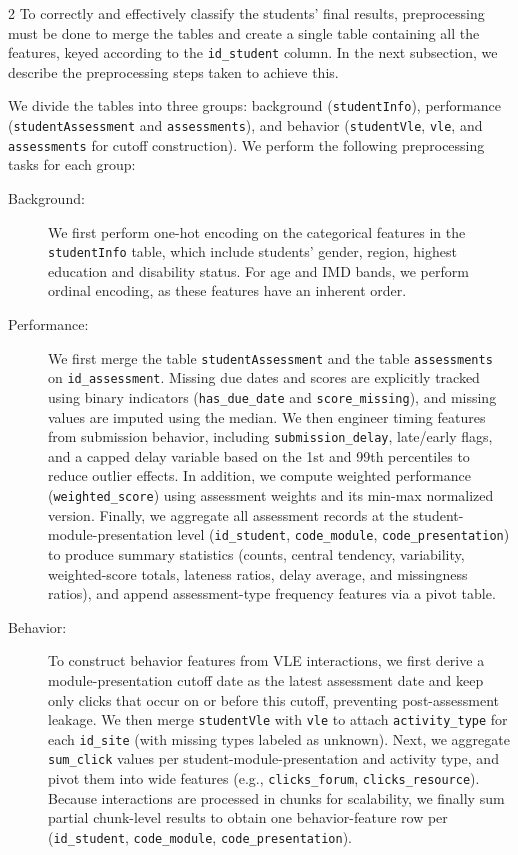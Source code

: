 \begin{multicols}{2}
To correctly and effectively classify the students' final results, preprocessing must be done to merge the tables and create a single table containing all the features, keyed according to the \texttt{id\_student} column. In the next subsection, we describe the preprocessing steps taken to achieve this.

We divide the tables into three groups: background (\texttt{studentInfo}), performance (\texttt{studentAssessment} and \texttt{assessments}), and behavior (\texttt{studentVle}, \texttt{vle}, and \texttt{assessments} for cutoff construction). We perform the following preprocessing tasks for each group:

\begin{description}
    \item[Background:] We first perform one-hot encoding on the categorical features in the \texttt{studentInfo} table, which include students' gender, region, highest education and disability status. For age and IMD bands, we perform ordinal encoding, as these features have an inherent order.
    \item[Performance:] We first merge the table \texttt{studentAssessment} and the table \texttt{assessments} on \texttt{id\_assessment}. Missing due dates and scores are explicitly tracked using binary indicators (\texttt{has\_due\_date} and \texttt{score\_missing}), and missing values are imputed using the median. We then engineer timing features from submission behavior, including \texttt{submission\_delay}, late/early flags, and a capped delay variable based on the 1st and 99th percentiles to reduce outlier effects. In addition, we compute weighted performance (\texttt{weighted\_score}) using assessment weights and its min-max normalized version. Finally, we aggregate all assessment records at the student-module-presentation level (\texttt{id\_student}, \texttt{code\_module}, \texttt{code\_presentation}) to produce summary statistics (counts, central tendency, variability, weighted-score totals, lateness ratios, delay average, and missingness ratios), and append assessment-type frequency features via a pivot table.
    \item[Behavior:] To construct behavior features from VLE interactions, we first derive a module-presentation cutoff date as the latest assessment date and keep only clicks that occur on or before this cutoff, preventing post-assessment leakage. We then merge \texttt{studentVle} with \texttt{vle} to attach \texttt{activity\_type} for each \texttt{id\_site} (with missing types labeled as unknown). Next, we aggregate \texttt{sum\_click} values per student-module-presentation and activity type, and pivot them into wide features (e.g., \texttt{clicks\_forum}, \texttt{clicks\_resource}). Because interactions are processed in chunks for scalability, we finally sum partial chunk-level results to obtain one behavior-feature row per (\texttt{id\_student}, \texttt{code\_module}, \texttt{code\_presentation}).
\end{description}


\end{multicols}
